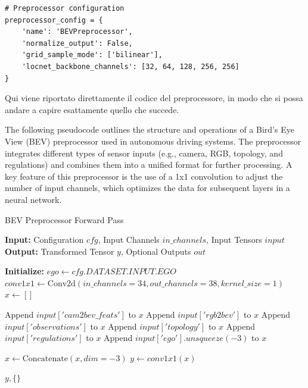 \begin{verbatim}
# Preprocessor configuration
preprocessor_config = {
    'name': 'BEVPreprocessor',
    'normalize_output': False,
    'grid_sample_mode': ['bilinear'],
    'locnet_backbone_channels': [32, 64, 128, 256, 256]
}
\end{verbatim}

Qui viene riportato direttamente il codice del preprocessore, in modo che si possa andare a capire esattamente quello che succede. 


The following pseudocode outlines the structure and operations of a Bird’s Eye View (BEV) preprocessor used in autonomous driving systems. The preprocessor integrates different types of sensor inputs (e.g., camera, RGB, topology, and regulations) and combines them into a unified format for further processing. A key feature of this preprocessor is the use of a 1x1 convolution to adjust the number of input channels, which optimizes the data for subsequent layers in a neural network.

\begin{algorithm}
\caption{BEV Preprocessor Forward Pass}
\begin{algorithmic}[1]
\State \textbf{Input:} Configuration $cfg$, Input Channels $in\_channels$, Input Tensors $input$
\State \textbf{Output:} Transformed Tensor $y$, Optional Outputs $out$

\State \textbf{Initialize:} 
\State \hspace{1cm} $ego \gets cfg.DATASET.INPUT.EGO$
\State \hspace{1cm} $conv1x1 \gets \text{Conv2d}(in\_channels=34, out\_channels=38, kernel\_size=1)$
\State $x \gets []$ 

    \State Append $input['cam2bev\_feats']$ to $x$
\EndIf
{}
    \State Append $input['rgb2bev']$ to $x$
\EndIf
{}
    \State Append $input['observations']$ to $x$
\EndIf
{}
    \State Append $input['topology']$ to $x$
\EndIf
{}
    \State Append $input['regulations']$ to $x$
\EndIf
{}
    \State Append $input['ego'].unsqueeze(-3)$ to $x$
\EndIf

\State $x \gets \text{Concatenate}(x, dim=-3)$ 
\State $y \gets conv1x1(x)$ 

\State \Return $y, \{\}$ 
\end{algorithmic}
\end{algorithm}


